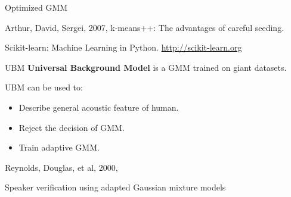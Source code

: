 \begin{frame}{Optimized GMM}
  \begin{reference}{4mm}{85mm}
    Arthur, David, Sergei, 2007,
    k-means++: The advantages of careful seeding.

    Scikit-learn: Machine Learning in {P}ython. \url{http://scikit-learn.org}
  \end{reference}
\end{frame}

\begin{frame}{UBM}
  \textbf{Universal Background Model} is a GMM trained on giant datasets.

  UBM can be used to:
  \begin{itemize}
    \item Describe general acoustic feature of human.
    \item Reject the decision of GMM.
    \item Train adaptive GMM.
  \end{itemize}

  \begin{reference}{4mm}{85mm}
    Reynolds, Douglas, et al, 2000,

    Speaker verification using adapted Gaussian mixture models
  \end{reference}
\end{frame}

